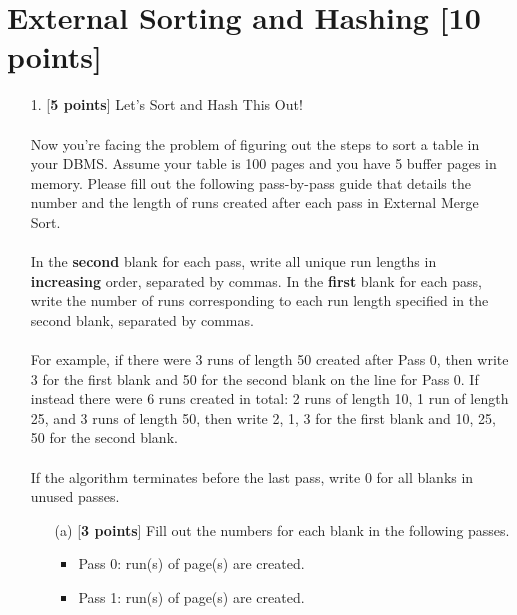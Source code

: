 \documentclass[10pt]{article}
\begin{document}
\section{External Sorting and Hashing \textbf{[10 points]}}
\begin{enumerate}
    \item[1.] [\textbf{5 points}] Let’s Sort and Hash This Out!
        \\
        \\
        Now you're facing the problem of figuring out the steps to sort a table in your DBMS. Assume your table is 100 pages and you have 5 buffer pages in memory. Please fill out the following pass-by-pass guide that details the number and the length of runs created after each pass in External Merge Sort.
        \\
        \\
        In the \textbf{second} blank for each pass, write all unique run lengths in \textbf{increasing} order, separated by commas. In the \textbf{first} blank for each pass, write the number of runs corresponding to each run length specified in the second blank, separated by commas.\\ \\
        For example, if there were 3 runs of length 50 created after Pass 0, then write 3 for the first blank and 50
        for the second blank on the line for Pass 0.
        If instead there were 6 runs created in total: 2 runs of length 10, 1 run of length 25, and 3 runs of length
        50, then write 2, 1, 3 for the first blank and 10, 25, 50 for the second blank. \\ \\
        If the algorithm terminates before the last pass, write 0 for all blanks in unused passes. \\
        \begin{enumerate}
            \item[(a)][\textbf{3 points}] Fill out the numbers for each blank in the following passes.\\
            \begin{itemize}
                \item Pass 0: \underline{\quad\quad\quad\quad} run(s) of \underline{\quad\quad\quad\quad} page(s) are created.\\
                \item Pass 1: \underline{\quad\quad\quad\quad} run(s) of \underline{\quad\quad\quad\quad} page(s) are created.\\

\end{itemize}
\end{enumerate}
\end{enumerate}
\end{document}

